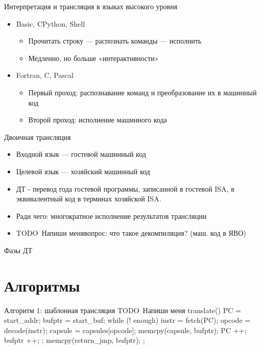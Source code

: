 \documentclass{beamer}
\newcommand{\todo}[1][Напиши меня]{{\color{red}TODO\ #1}}
\begin{document}
\begin{frame}{Интерпретация и трансляция в языках высокого уровня}
\begin{itemize}
\item Basic, CPython, Shell
    \begin{itemize}
    \item Прочитать строку — распознать команды — исполнить
    \item Медленно, но больше «интерактивности»
    \end{itemize}
\item Fortran, C, Pascal
    \begin{itemize}
    \item Первый проход: распознавание команд и преобразование их в машинный код
    \item Второй проход: исполнение машинного кода
    \end{itemize}
\end{itemize}
\end{frame}

\begin{frame}{Двоичная трансляция}
\begin{itemize}
\item Входной язык — гостевой машинный код
\item Целевой язык — хозяйский машинный код
\item ДТ - перевод года гостевой программы, записанной в гостевой ISA, в эквивалентный код в терминах хозяйской ISA.
\item Ради чего: многократное исполнение результатов трансляции
\item \todo вопрос: что такое декомпиляция? (маш. код в ЯВО)
\end{itemize}
\end{frame}

\begin{frame}[fragile]{Фазы ДТ}
\centering

\end{frame}

\section{Алгоритмы}

\begin{frame}{Алгоритм 1: шаблонная трансляция}
\todo
translate() {
PC = start_addr;
bufptr = start_buf;
while (! enough) {
instr = fetch(PC);
opcode = decode(instr);
capsule = capsules[opcode];
memcpy(capsule, bufptr);
PC ++;
bufptr ++;
};
memcpy(return_jmp, bufptr);
};
\end{frame}
\end{document}
